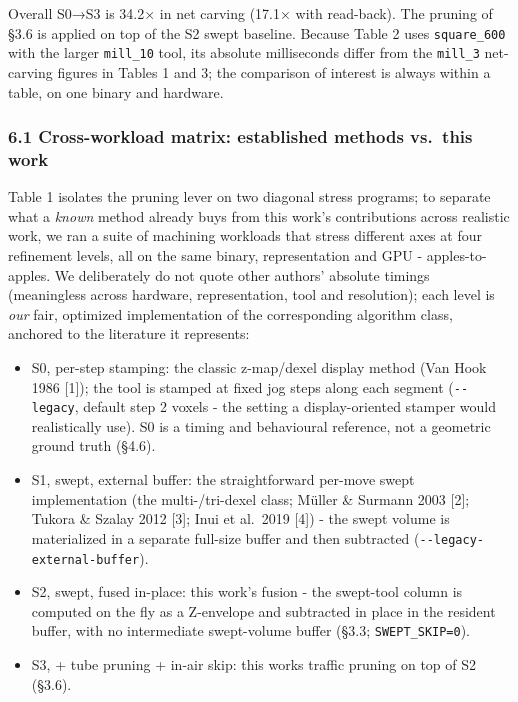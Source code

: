 \documentclass[
]{article}
\providecommand{\tightlist}{%
  \setlength{\itemsep}{0pt}\setlength{\parskip}{0pt}}
\begin{document}
Overall S0→S3 is 34.2× in net carving (17.1× with read-back). The
pruning of §3.6 is applied on top of the S2 swept baseline. Because
Table 2 uses \texttt{square\_600} with the larger \texttt{mill\_10}
tool, its absolute milliseconds differ from the \texttt{mill\_3}
net-carving figures in Tables 1 and 3; the comparison of interest is
always within a table, on one binary and hardware.

\hypertarget{cross-workload-matrix-established-methods-vs.-this-work}{%
\subsubsection{6.1 Cross-workload matrix: established methods vs.~this
work}\label{cross-workload-matrix-established-methods-vs.-this-work}}

Table 1 isolates the pruning lever on two diagonal stress programs; to
separate what a \emph{known} method already buys from this work's
contributions across realistic work, we ran a suite of machining
workloads that stress different axes at four refinement levels, all on
the same binary, representation and GPU - apples-to-apples. We
deliberately do not quote other authors' absolute timings (meaningless
across hardware, representation, tool and resolution); each level is
\emph{our} fair, optimized implementation of the corresponding algorithm
class, anchored to the literature it represents:

\begin{itemize}
\tightlist
\item
  S0, per-step stamping: the classic z-map/dexel display method (Van
  Hook 1986 {[}1{]}); the tool is stamped at fixed jog steps along each
  segment (\texttt{-\/-legacy}, default step 2 voxels - the setting a
  display-oriented stamper would realistically use). S0 is a timing and
  behavioural reference, not a geometric ground truth (§4.6).
\item
  S1, swept, external buffer: the straightforward per-move swept
  implementation (the multi-/tri-dexel class; Müller \& Surmann 2003
  {[}2{]}; Tukora \& Szalay 2012 {[}3{]}; Inui et al.~2019 {[}4{]}) -
  the swept volume is materialized in a separate full-size buffer and
  then subtracted (\texttt{-\/-legacy-external-buffer}).
\item
  S2, swept, fused in-place: this work's fusion - the swept-tool column
  is computed on the fly as a Z-envelope and subtracted in place in the
  resident buffer, with no intermediate swept-volume buffer (§3.3;
  \texttt{SWEPT\_SKIP=0}).
\item
  S3, + tube pruning + in-air skip: this work\textquotesingle s traffic
  pruning on top of S2 (§3.6).
\end{itemize}
\end{document}
